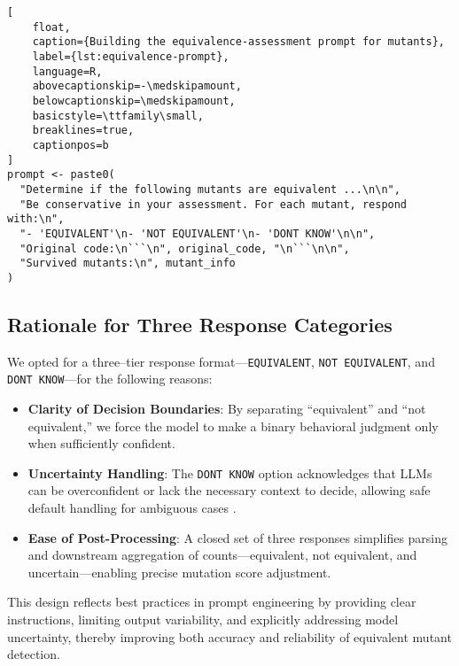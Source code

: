 \medskip
\begin{lstlisting}[
    float,
    caption={Building the equivalence‐assessment prompt for mutants},
    label={lst:equivalence-prompt},
    language=R,
    abovecaptionskip=-\medskipamount,
    belowcaptionskip=\medskipamount,
    basicstyle=\ttfamily\small,
    breaklines=true,
    captionpos=b
]
prompt <- paste0(
  "Determine if the following mutants are equivalent ...\n\n",
  "Be conservative in your assessment. For each mutant, respond with:\n",
  "- 'EQUIVALENT'\n- 'NOT EQUIVALENT'\n- 'DONT KNOW'\n\n",
  "Original code:\n```\n", original_code, "\n```\n\n",
  "Survived mutants:\n", mutant_info
)
\end{lstlisting}


\subsection{Rationale for Three Response Categories}

We opted for a three–tier response format—\texttt{EQUIVALENT}, \texttt{NOT EQUIVALENT}, and \texttt{DONT KNOW}—for the following reasons:

\begin{itemize}
  \item \textbf{Clarity of Decision Boundaries}: By separating “equivalent” and “not equivalent,” we force the model to make a binary behavioral judgment only when sufficiently confident.
  \item \textbf{Uncertainty Handling}: The \texttt{DONT KNOW} option acknowledges that LLMs can be overconfident or lack the necessary context to decide, allowing safe default handling for ambiguous cases \cite{liu2021pre}.
  \item \textbf{Ease of Post-Processing}: A closed set of three responses simplifies parsing and downstream aggregation of counts—equivalent, not equivalent, and uncertain—enabling precise mutation score adjustment.
\end{itemize}

This design reflects best practices in prompt engineering by providing clear instructions, limiting output variability, and explicitly addressing model uncertainty, thereby improving both accuracy and reliability of equivalent mutant detection.